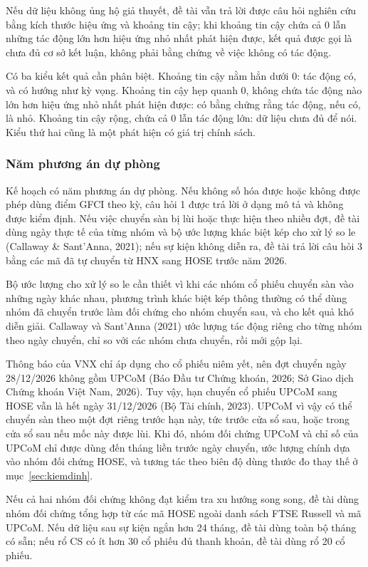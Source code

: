 Nếu dữ liệu không ủng hộ giả thuyết, đề tài vẫn trả lời được câu hỏi nghiên cứu bằng kích thước hiệu ứng và khoảng tin cậy; khi khoảng tin cậy chứa cả 0 lẫn những tác động lớn hơn hiệu ứng nhỏ nhất phát hiện được, kết quả được gọi là chưa đủ cơ sở kết luận, không phải bằng chứng về việc không có tác động.

Có ba kiểu kết quả cần phân biệt. Khoảng tin cậy nằm hẳn dưới 0: tác động có, và có hướng như  kỳ vọng. Khoảng tin cậy hẹp quanh 0, không chứa tác động nào lớn hơn hiệu ứng nhỏ nhất phát hiện được: có bằng chứng rằng tác động, nếu có, là nhỏ. Khoảng tin cậy rộng, chứa cả 0 lẫn tác động lớn: dữ liệu chưa đủ để nói. Kiểu thứ hai cũng là một phát hiện có giá trị chính sách.

\subsubsection*{Năm phương án dự phòng}

Kế hoạch có năm phương án dự phòng. Nếu không số hóa được hoặc không được phép dùng điểm GFCI theo kỳ, câu hỏi 1 được trả lời ở dạng mô tả và  không được kiểm định. Nếu việc chuyển sàn bị lùi hoặc thực hiện theo nhiều đợt, đề tài dùng ngày thực tế của từng nhóm và bộ ước lượng khác biệt kép cho xử lý so le (Callaway \& Sant'Anna, 2021); nếu sự kiện không diễn ra, đề tài trả lời câu hỏi 3 bằng các mã đã tự chuyển từ HNX sang HOSE trước năm 2026.

Bộ ước lượng cho xử lý so le cần thiết vì khi các nhóm cổ phiếu chuyển sàn vào những ngày khác nhau, phương trình khác biệt kép thông thường có thể dùng nhóm đã chuyển trước làm đối chứng cho nhóm chuyển sau, và cho kết quả khó diễn giải. Callaway và Sant'Anna (2021) ước lượng tác động riêng cho từng nhóm theo ngày chuyển, chỉ so với các nhóm chưa chuyển, rồi mới gộp lại.

Thông báo của VNX chỉ áp dụng cho cổ phiếu niêm yết, nên đợt chuyển ngày 28/12/2026 không gồm UPCoM (Báo Đầu tư Chứng khoán, 2026; Sở Giao dịch Chứng khoán Việt Nam, 2026). Tuy vậy, hạn chuyển cổ phiếu UPCoM sang HOSE vẫn là hết ngày 31/12/2026 (Bộ Tài chính, 2023). UPCoM vì vậy có thể chuyển sàn theo một đợt riêng trước hạn này, tức trước cửa sổ sau, hoặc trong cửa sổ sau nếu mốc này được lùi. Khi đó, nhóm đối chứng UPCoM và chỉ số của UPCoM chỉ được dùng đến tháng liền trước ngày chuyển, ước lượng chính dựa vào nhóm đối chứng HOSE, và tương tác theo biên độ dùng thước đo thay thế ở mục~\ref{sec:kiemdinh}.

Nếu cả hai nhóm đối chứng không đạt kiểm tra xu hướng song song, đề tài dùng nhóm đối chứng tổng hợp từ các mã HOSE ngoài danh sách FTSE Russell và mã UPCoM. Nếu dữ liệu sau sự kiện ngắn hơn 24 tháng, đề tài dùng toàn bộ tháng có sẵn; nếu rổ CS có ít hơn 30 cổ phiếu đủ thanh khoản, đề tài dùng rổ 20 cổ phiếu.

